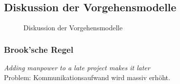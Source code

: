 \subsection{Diskussion der Vorgehensmodelle}
\begin{figure}[ht]
	\centering
	\caption[]{Diskussion der Vorgehensmodelle}
\end{figure} 

\subsubsection{Brook'sche Regel}
\textit{Adding manpower to a late project makes it later} \\
Problem: Kommunikationsaufwand wird massiv erhöht.


